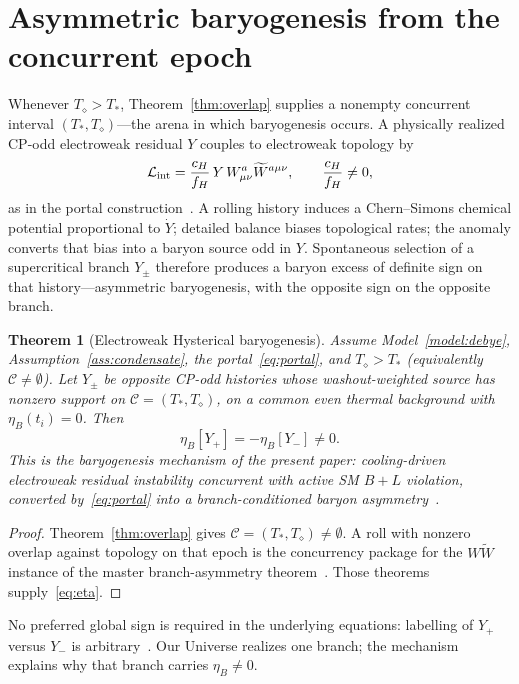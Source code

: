 \documentclass[11pt]{article}
\newtheorem{theorem}{Theorem}[section]
\theoremstyle{definition}
\theoremstyle{remark}
\newcommand{\Td}{T_{\diamond}}
\begin{document}
\section{Asymmetric baryogenesis from the concurrent epoch}
\label{sec:asymmetry}
Whenever $\Td>T_*$, Theorem~\ref{thm:overlap} supplies a nonempty concurrent
interval $(T_*,\Td)$---the arena in which baryogenesis occurs.
A physically realized CP-odd electroweak residual $Y$ couples to electroweak
topology by
\begin{equation}
\label{eq:portal}
\mathcal L_{\rm int}=\frac{c_H}{f_H}\,Y\,W^a_{\mu\nu}\widetilde W^{a\mu\nu},
\qquad \frac{c_H}{f_H}\neq0,
\end{equation}
as in the portal construction~\cite{boyd2026branch,Domcke2020}.
A rolling history induces a Chern--Simons chemical potential proportional to
$\dot Y$; detailed balance biases topological rates; the anomaly converts that
bias into a baryon source odd in $Y$.
Spontaneous selection of a supercritical branch $Y_\pm$ therefore produces a
baryon excess of definite sign on that history---asymmetric baryogenesis, with
the opposite sign on the opposite branch.

\begin{theorem}[Electroweak Hysterical baryogenesis]
\label{thm:ew-asym}
Assume Model~\ref{model:debye}, Assumption~\ref{ass:condensate}, the
portal~\eqref{eq:portal}, and $\Td>T_*$ (equivalently $\mathcal C\neq\emptyset$).
Let $Y_\pm$ be opposite CP-odd histories whose washout-weighted source has
nonzero support on $\mathcal C=(T_*,\Td)$, on a common even thermal background
with $\eta_B(t_i)=0$.
Then
\begin{equation}
\label{eq:eta}
\boxed{\eta_B[Y_+]=-\eta_B[Y_-]\neq0.}
\end{equation}
This is the baryogenesis mechanism of the present paper: cooling-driven
electroweak residual instability concurrent with active SM $B{+}L$ violation,
converted by~\eqref{eq:portal} into a branch-conditioned baryon
asymmetry~\cite{boyd2026branch}.
\end{theorem}

\begin{proof}
Theorem~\ref{thm:overlap} gives $\mathcal C=(T_*,\Td)\neq\emptyset$.
A roll with nonzero overlap against topology on that epoch is the concurrency
package for the $W\widetilde W$ instance of the
master branch-asymmetry theorem~\cite{boyd2026branch}.
Those theorems supply~\eqref{eq:eta}.
\end{proof}

No preferred global sign is required in the underlying equations: labelling of
$Y_+$ versus $Y_-$ is arbitrary~\cite{boyd2026branch}.
Our Universe realizes one branch; the mechanism explains why that branch carries
$\eta_B\neq0$.
\end{document}

